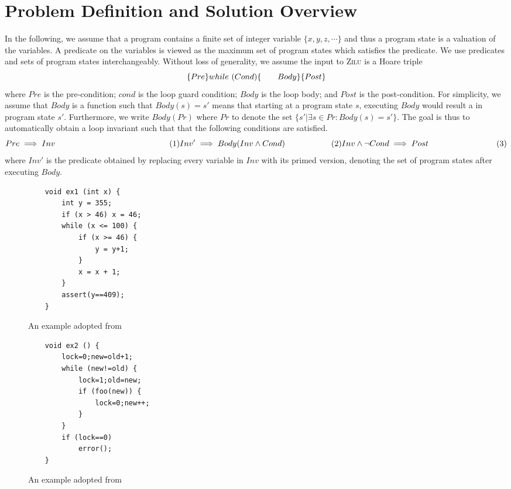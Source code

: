 
\section{Problem Definition and Solution Overview}
In the following, we assume that a program contains a finite set of integer variable $\{x,y,z,\cdots\}$ and thus a program state is a valuation of the variables. A predicate on the variables is viewed as the maximum set of program states which satisfies the predicate. We use predicates and sets of program states interchangeably. Without loss of generality, we assume the input to \textsc{Zilu} is a Hoare triple
\[
\{Pre\} \\
while~(Cond) \{ \\
~~~~~~Body \\
\} \\
\{Post\}
\]
where $Pre$ is the pre-condition; $cond$ is the loop guard condition; $Body$ is the loop body; and $Post$ is the post-condition. For simplicity, we assume that $Body$ is a function such that $Body(s) = s'$ means that starting at a program state $s$, executing $Body$ would result a in program state $s'$. Furthermore, we write $Body(Pr)$ where $Pr$ to denote the set $\{s' | \exists s \in Pr: Body(s) = s'\}$. The goal is thus to automatically obtain a loop invariant such that that the following conditions are satisfied.
\[
Pre \implies Inv ~~~~~~~~~~~~~~~~~~~~~~~~~~~~~~~~~~~~~~~~~~(1) \\
Inv' \implies Body(Inv \land Cond) ~~~~~~~~~~~~~~~~~ (2) \\
Inv \land \neg Cond \implies Post ~~~~~~~~~~~~~~~~~~~~~~~~~ (3)
\]
where $Inv'$ is the predicate obtained by replacing every variable in $Inv$ with its primed version, denoting the set of program states after executing $Body$.

\begin{figure}[t]
\centering
\begin{minipage}{.5\textwidth}
  \centering
{\scriptsize
\begin{verbatim}
    void ex1 (int x) {
        int y = 355;
        if (x > 46) x = 46;
        while (x <= 100) {
            if (x >= 46) {
                y = y+1;
            }
            x = x + 1;
        }
        assert(y==409);
    }
\end{verbatim}}
  \caption{An example adopted from~\cite{DBLP:conf/popl/GulwaniJ07}}
  \label{fig:test1}
\end{minipage}%
\begin{minipage}{.5\textwidth}
  \centering
    {\scriptsize\begin{verbatim}
    void ex2 () {
        lock=0;new=old+1;
        while (new!=old) {
            lock=1;old=new;
            if (foo(new)) {
                lock=0;new++;
            }
        }
        if (lock==0)
            error();
    }
\end{verbatim}}
  \caption{An example adopted from~\cite{DBLP:conf/popl/HenzingerJMS02}}
  \label{fig:test2}
\end{minipage}
\end{figure}

